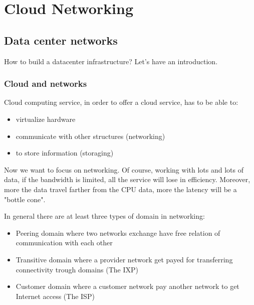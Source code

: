 \section{Cloud Networking}


\subsection{Data center networks}
    How to build a datacenter infrastructure? Let's have an introduction.
    
    \subsubsection{Cloud and networks}
        Cloud computing service, in order to offer a cloud service, has to be able to:
        \begin{itemize}
            \item virtualize hardware
            \item communicate with other structures (networking)
            \item to store information (storaging)
        \end{itemize}
        Now we want to focus on networking. Of course, working with lots and lots of data, if the bandwidth is limited, all the service will lose in efficiency. Moreover, more the data travel farther from the CPU data, more the latency will be a "bottle cone".

        In general there are at least three types of domain in networking:
        \begin{itemize}
            \item Peering domain where two networks exchange  have free relation of communication with each other
            \item Transitive domain where a provider network get payed  for transferring connectivity trough domains (The IXP)
            \item Customer domain where a customer network pay another network to get Internet access (The ISP)
        \end{itemize}
        
